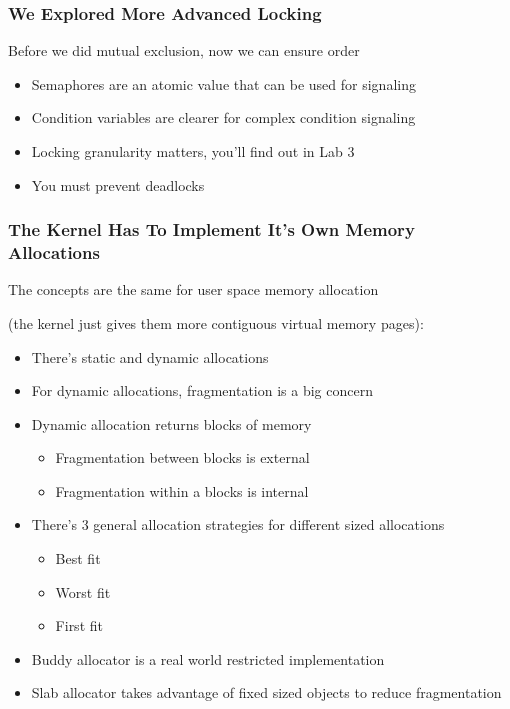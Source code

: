   \begin{frame}
    \frametitle{We Explored More Advanced Locking}

    Before we did mutual exclusion, now we can ensure order

    \begin{itemize}
      \item Semaphores are an atomic value that can be used for signaling
      \item Condition variables are clearer for complex condition signaling
      \item Locking granularity matters, you'll find out in Lab 3
      \item You must prevent deadlocks
    \end{itemize}
  \end{frame}

  \begin{frame}
    \frametitle{The Kernel Has To Implement It's Own Memory Allocations}

    The concepts are the same for user space memory allocation

    (the kernel just gives them more contiguous virtual memory pages):

    \begin{itemize}
      \item There's static and dynamic allocations
      \item For dynamic allocations, fragmentation is a big concern
      \item Dynamic allocation returns blocks of memory
        \begin{itemize}
          \item Fragmentation between blocks is external
          \item Fragmentation within a blocks is internal
        \end{itemize}
      \item There's 3 general allocation strategies for different sized
            allocations
        \begin{itemize}
          \item Best fit
          \item Worst fit
          \item First fit
        \end{itemize}
      \item Buddy allocator is a real world restricted implementation
      \item Slab allocator takes advantage of fixed sized objects to reduce
            fragmentation
    \end{itemize}
  \end{frame}

